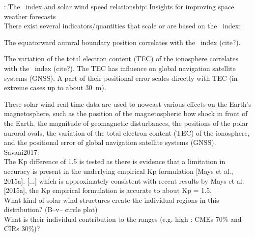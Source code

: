 
\citet{Elliott2013}: The \Kp~index and solar wind speed relationship: Insights for improving space weather forecasts\\

There exist several indicators/quantities that scale or are based on the \Kp{}~index:
\begin{itemize*}
	\item The equatorward auroral boundary position correlates with the \Kp~index (cite?).
	\item The variation of the total electron content (TEC) of the ionosphere correlates with the \Kp~index (cite?). The TEC has influence on global navigation satellite systems (GNSS). A part of their positional error scales directly with TEC (in extreme cases up to about \SI{30}{\m}).
\end{itemize*}

These solar wind real-time data are used to nowcast various effects on the Earth's magnetosphere, such as the position of the magnetospheric bow shock in front of the Earth, the magnitude of geomagnetic disturbances, the positions of the polar auroral ovals, the variation of the total electron content (TEC) of the ionosphere, and the positional error of global navigation satellite systems (GNSS).\\

Savani2017:\\
The Kp difference of 1.5 is tested as there is evidence that a limitation in accuracy is present in the underlying empirical Kp formulation [Mays et al., 2015a]. [...] which is approximately consistent with recent results by Mays et al. [2015a], the Kp empirical formulation is accurate to about Kp = 1.5.\\

What kind of solar wind structures create the individual regions in this distribution? (B--v--\Kp{} circle plot)\\
What is their individual contribution to the \Kp{} ranges (e.g. high \Kp{}: CMEs 70\% and CIRs 30\%)?\\

